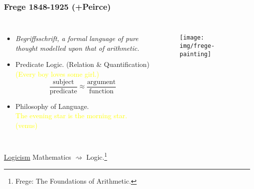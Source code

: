 \documentclass[UTF8,aspectratio=43,11pt,colorlinks,compress,openany]{beamer}%
\begin{document}
\begin{frame}\frametitle{Frege 1848-1925 (+Peirce)}
	\begin{columns}
			\begin{itemize}
				\item \emph{Begriffsschrift, a formal language of pure thought modelled upon that of arithmetic.}
				\item Predicate Logic. (Relation \& Quantification)\\
				\textcolor{yellow}{(Every boy loves some girl.)}
				\[\dfrac{\text{subject}}{\text{predicate}} \approx \dfrac{\text{argument}}{\text{function}}\]
				\item Philosophy of Language.\\
				\textcolor{yellow}{The evening star is the morning star. (venus)}
			\end{itemize}
			\begin{figure}
				\texttt{[image: img/frege-painting]}
			\end{figure}
	\end{columns}
	\centerline{\colorbox{green!30}{\underline{Logicism}} Mathematics $\rightsquigarrow$ Logic.\footnote{\tiny Frege: The Foundations of Arithmetic.}}
\end{frame}
\end{document}
